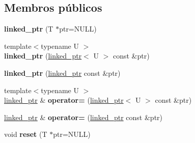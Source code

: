 \subsection*{Membros públicos}
\begin{DoxyCompactItemize}
\item 
\hypertarget{classtesting_1_1internal_1_1linked__ptr_ae805418b9f03f14ff49649e710475dba}{{\bfseries linked\-\_\-ptr} (T $\ast$ptr=N\-U\-L\-L)}\label{classtesting_1_1internal_1_1linked__ptr_ae805418b9f03f14ff49649e710475dba}

\item 
\hypertarget{classtesting_1_1internal_1_1linked__ptr_a7597ed91006edd0467c99bd1aaab07f5}{{\footnotesize template$<$typename U $>$ }\\{\bfseries linked\-\_\-ptr} (\hyperlink{classtesting_1_1internal_1_1linked__ptr}{linked\-\_\-ptr}$<$ U $>$ const \&ptr)}\label{classtesting_1_1internal_1_1linked__ptr_a7597ed91006edd0467c99bd1aaab07f5}

\item 
\hypertarget{classtesting_1_1internal_1_1linked__ptr_abc076b5678cc7f64306d5ecfefc93aff}{{\bfseries linked\-\_\-ptr} (\hyperlink{classtesting_1_1internal_1_1linked__ptr}{linked\-\_\-ptr} const \&ptr)}\label{classtesting_1_1internal_1_1linked__ptr_abc076b5678cc7f64306d5ecfefc93aff}

\item 
\hypertarget{classtesting_1_1internal_1_1linked__ptr_a82608d98869b750d9ab729f1450a9a45}{{\footnotesize template$<$typename U $>$ }\\\hyperlink{classtesting_1_1internal_1_1linked__ptr}{linked\-\_\-ptr} \& {\bfseries operator=} (\hyperlink{classtesting_1_1internal_1_1linked__ptr}{linked\-\_\-ptr}$<$ U $>$ const \&ptr)}\label{classtesting_1_1internal_1_1linked__ptr_a82608d98869b750d9ab729f1450a9a45}

\item 
\hypertarget{classtesting_1_1internal_1_1linked__ptr_a1f40b5e66e6cf7b661ea116c806f952e}{\hyperlink{classtesting_1_1internal_1_1linked__ptr}{linked\-\_\-ptr} \& {\bfseries operator=} (\hyperlink{classtesting_1_1internal_1_1linked__ptr}{linked\-\_\-ptr} const \&ptr)}\label{classtesting_1_1internal_1_1linked__ptr_a1f40b5e66e6cf7b661ea116c806f952e}

\item 
\hypertarget{classtesting_1_1internal_1_1linked__ptr_a95ba3b7b66ed0193c779976c6e126ab6}{void {\bfseries reset} (T $\ast$ptr=N\-U\-L\-L)}\label{classtesting_1_1internal_1_1linked__ptr_a95ba3b7b66ed0193c779976c6e126ab6}


\end{DoxyCompactItemize}
